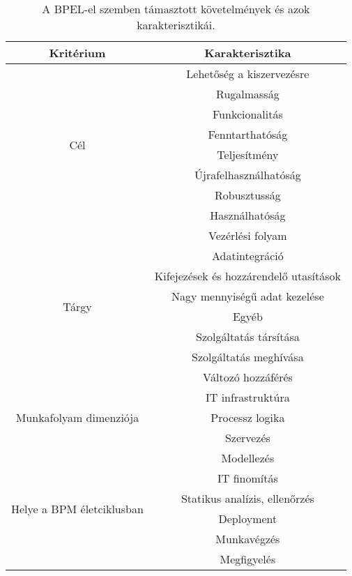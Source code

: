 \begin{table}[h!]
\centering
\caption{A BPEL-el szemben támasztott követelmények és azok karakterisztikái.}
\label{tab:bpel_characteristics}
\begin{tabular}{|c|c|}
\hline
\textbf{Kritérium} & \textbf{Karakterisztika}\\
\hline
\multirow{8}{7em}{Cél} & Lehetőség a kiszervezésre\\
& Rugalmasság\\
& Funkcionalitás\\
& Fenntarthatóság\\
& Teljesítmény\\
& Újrafelhasználhatóság\\
& Robusztusság\\
& Használhatóság\\
\hline
\multirow{8}{7em}{Tárgy} & Vezérlési folyam\\
& Adatintegráció\\
& Kifejezések és hozzárendelő utasítások\\
& Nagy mennyiségű adat kezelése\\
& Egyéb \\
& Szolgáltatás társítása\\
& Szolgáltatás meghívása\\
& Változó hozzáférés\\
\hline
\multirow{3}{7em}{Munkafolyam dimenziója} & IT infrastruktúra\\
& Processz logika\\
& Szervezés\\
\hline
\multirow{6}{7em}{Helye a BPM életciklusban} & Modellezés\\
& IT finomítás\\
& Statikus analízis, ellenőrzés\\
& Deployment\\
& Munkavégzés\\
& Megfigyelés\\
\hline
\end{tabular}
\end{table}

